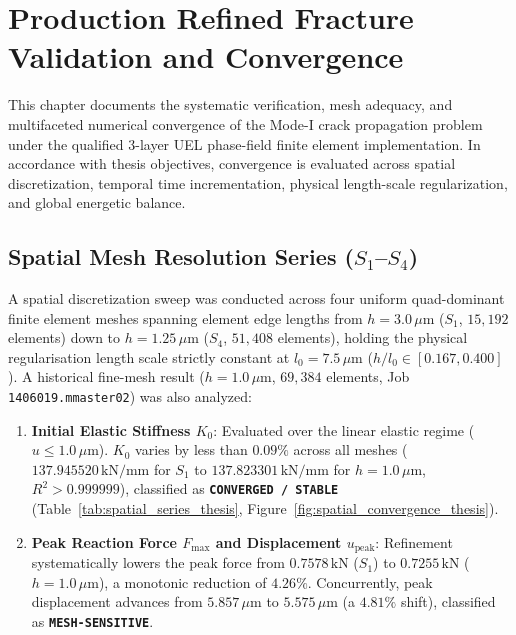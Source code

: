 \chapter{Production Refined Fracture Validation and Convergence}
\label{chap:production_refined_validation}

This chapter documents the systematic verification, mesh adequacy, and multifaceted numerical convergence of the Mode-I crack propagation problem under the qualified 3-layer UEL phase-field finite element implementation. In accordance with thesis objectives, convergence is evaluated across spatial discretization, temporal time incrementation, physical length-scale regularization, and global energetic balance.

\section{Spatial Mesh Resolution Series ($S_1$--$S_4$)}
\label{sec:spatial_series_study}

A spatial discretization sweep was conducted across four uniform quad-dominant finite element meshes spanning element edge lengths from $h = 3.0\,\mu\text{m}$ ($S_1$, $15{,}192$ elements) down to $h = 1.25\,\mu\text{m}$ ($S_4$, $51{,}408$ elements), holding the physical regularisation length scale strictly constant at $l_0 = 7.5\,\mu\text{m}$ ($h/l_0 \in [0.167, 0.400]$). A historical fine-mesh result ($h = 1.0\,\mu\text{m}$, $69{,}384$ elements, Job \texttt{1406019.mmaster02}) was also analyzed:
\begin{enumerate}
    \item \textbf{Initial Elastic Stiffness $K_0$}: Evaluated over the linear elastic regime ($u \le 1.0\,\mu\text{m}$). $K_0$ varies by less than $0.09\%$ across all meshes ($137.945520\,\text{kN/mm}$ for $S_1$ to $137.823301\,\text{kN/mm}$ for $h=1.0\,\mu\text{m}$, $R^2 > 0.999999$), classified as \textbf{\texttt{CONVERGED / STABLE}} (Table~\ref{tab:spatial_series_thesis}, Figure~\ref{fig:spatial_convergence_thesis}).
    \item \textbf{Peak Reaction Force $F_{\max}$ and Displacement $u_{\mathrm{peak}}$}: Refinement systematically lowers the peak force from $0.7578\,\text{kN}$ ($S_1$) to $0.7255\,\text{kN}$ ($h=1.0\,\mu\text{m}$), a monotonic reduction of $4.26\%$. Concurrently, peak displacement advances from $5.857\,\mu\text{m}$ to $5.575\,\mu\text{m}$ (a $4.81\%$ shift), classified as \textbf{\texttt{MESH-SENSITIVE}}.
\end{enumerate}

